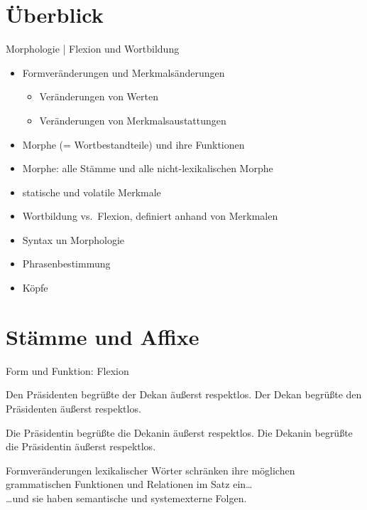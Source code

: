 \section{Überblick}

\begin{frame}
  {Morphologie | Flexion und Wortbildung}
  \pause
  \begin{itemize}[<+->]
    \item \alert{Formveränderungen} und \alert{Merkmalsänderungen}
      \begin{itemize}[<+->]
        \item Veränderungen von Werten
        \item Veränderungen von Merkmalsaustattungen
      \end{itemize}
      \Halbzeile
    \item Morphe (= Wortbestandteile) und ihre Funktionen
    \item Morphe: alle Stämme und alle nicht-lexikalischen Morphe
      \Halbzeile
    \item statische und volatile Merkmale
    \item Wortbildung vs.\ Flexion, definiert anhand von Merkmalen
      \Halbzeile
    \item Syntax un Morphologie
    \item Phrasenbestimmung
    \item Köpfe
  \end{itemize}
\end{frame}


\section{Stämme und Affixe}

\begin{frame}
  {Form und Funktion: Flexion}
  \pause
  \begin{exe}
    \ex
    \begin{xlist}
      \ex \alert{Den Präsidenten} begrüßte \alert{der Dekan} äußerst respektlos.
      \pause
      \ex \alert{Der Dekan} begrüßte \alert{den Präsidenten} äußerst respektlos.
    \end{xlist}
    \pause
    \ex
    \begin{xlist}
      \ex \alert{Die Präsidentin} begrüßte \alert{die Dekanin} äußerst respektlos.
      \pause
      \ex \alert{Die Dekanin} begrüßte \alert{die Präsidentin} äußerst respektlos.
    \end{xlist}
  \end{exe}
  \pause
  \Zeile
  Formveränderungen lexikalischer Wörter \alert{schränken ihre möglichen grammatischen Funktionen und Relationen im Satz ein}\dots\\
  \pause
  \Halbzeile
  \dots und sie haben semantische und systemexterne Folgen.

\end{frame}

